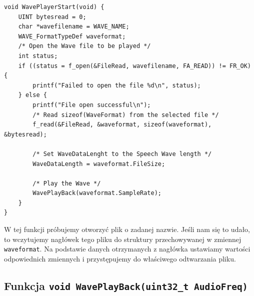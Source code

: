 \documentclass[12pt,a4paper]{article}
\begin{document}
\begin{lstlisting}
void WavePlayerStart(void) {
    UINT bytesread = 0;
    char *wavefilename = WAVE_NAME;
    WAVE_FormatTypeDef waveformat;
    /* Open the Wave file to be played */
    int status;
    if ((status = f_open(&FileRead, wavefilename, FA_READ)) != FR_OK) {
        printf("Failed to open the file %d\n", status);
    } else {
        printf("File open successful\n");
        /* Read sizeof(WaveFormat) from the selected file */
        f_read(&FileRead, &waveformat, sizeof(waveformat), &bytesread);

        /* Set WaveDataLenght to the Speech Wave length */
        WaveDataLength = waveformat.FileSize;

        /* Play the Wave */
        WavePlayBack(waveformat.SampleRate);
    }
}
\end{lstlisting}

W tej funkcji próbujemy otworzyć plik o zadanej nazwie. Jeśli nam się to udało, to wczytujemy nagłówek tego pliku do struktury przechowywanej w zmiennej \texttt{waveformat}. Na podstawie danych otrzymanych z nagłówka ustawiamy wartości odpowiednich zmiennych i przystępujemy do właściwego odtwarzania pliku.

\subsection{Funkcja \texttt{void WavePlayBack(uint32\_t AudioFreq)}}
\end{document}
